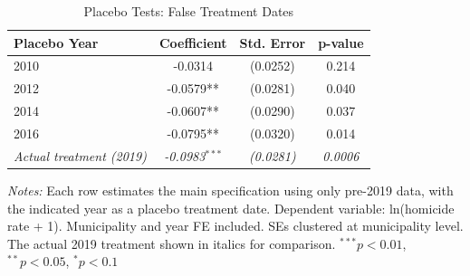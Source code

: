 \begin{table}[htbp]
\centering
\caption{Placebo Tests: False Treatment Dates}
\label{tab:placebo}
\begin{tabular}{lccc}
\toprule
Placebo Year & Coefficient & Std. Error & p-value \\
\midrule
2010 & -0.0314 & (0.0252) & 0.214 \\
2012 & -0.0579** & (0.0281) & 0.040 \\
2014 & -0.0607** & (0.0290) & 0.037 \\
2016 & -0.0795** & (0.0320) & 0.014 \\
\midrule
\textit{Actual treatment (2019)} & \textit{-0.0983}$^{***}$ & \textit{(0.0281)} & \textit{0.0006} \\
\bottomrule
\end{tabular}
\begin{tablenotes}[flushleft]\small
\item \textit{Notes:} Each row estimates the main specification using only pre-2019 data, with the indicated year as a placebo treatment date. Dependent variable: ln(homicide rate + 1). Municipality and year FE included. SEs clustered at municipality level. The actual 2019 treatment shown in italics for comparison. $^{***}p<0.01$, $^{**}p<0.05$, $^{*}p<0.1$
\end{tablenotes}
\end{table}
